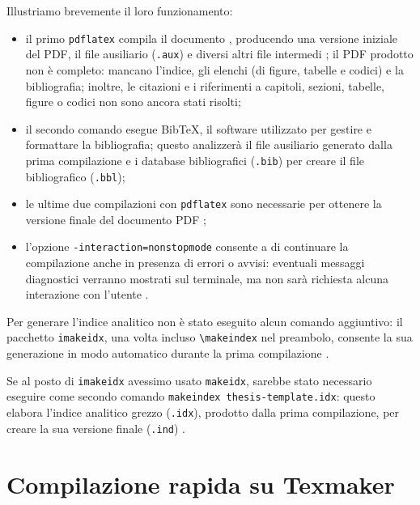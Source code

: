 Illustriamo brevemente il loro funzionamento:
\begin{itemize}

\item il primo \texttt{pdflatex} compila il documento \latex , producendo una versione iniziale del PDF, il file ausiliario (\texttt{.aux}) e diversi altri file intermedi \cite{latex2023manual}; il PDF prodotto non è completo: mancano l'indice, gli elenchi (di figure, tabelle e codici) e la bibliografia; inoltre, le citazioni e i riferimenti a capitoli, sezioni, tabelle, figure o codici non sono ancora stati risolti;

\item il secondo comando esegue Bib\TeX, il software utilizzato per gestire e formattare la bibliografia; questo analizzerà il file ausiliario generato dalla prima compilazione e i database bibliografici (\texttt{.bib}) per creare il file bibliografico \latex (\texttt{.bbl})\cite{bibtex2007faq};

\item le ultime due compilazioni con \texttt{pdflatex} sono necessarie per ottenere la versione finale del documento PDF \cite{latex2023manual};

\item l'opzione \texttt{-interaction=nonstopmode} consente a \latex di continuare la compilazione anche in presenza di errori o avvisi: eventuali messaggi diagnostici verranno mostrati sul terminale, ma non sarà richiesta alcuna interazione con l'utente \cite{latex2023manual}.

\end{itemize}

Per generare l'indice analitico non è stato eseguito alcun comando aggiuntivo: il pacchetto \texttt{imakeidx}, una volta incluso \texttt{\textbackslash makeindex} nel preambolo, consente la sua generazione in modo automatico durante la prima compilazione \cite{imakeidx2023doc}.

\medskip

Se al posto di \texttt{imakeidx} avessimo usato \texttt{makeidx}, sarebbe stato necessario eseguire come secondo comando \texttt{makeindex thesis-template.idx}: questo elabora l'indice analitico grezzo (\texttt{.idx}), prodotto dalla prima compilazione, per creare la sua versione finale (\texttt{.ind}) \cite{latex2023manual}.

\section{Compilazione rapida su Texmaker}

